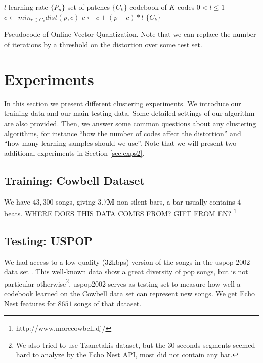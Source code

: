 \documentclass{article}
\begin{document}
\begin{algorithm}
\begin{algorithmic}
\STATE$l$ learning rate
\STATE$\{P_n\}$ set of patches
\STATE$\{C_k\}$ codebook of $K$ codes
\REQUIRE $0 < l \leq 1$
\STATE$c \leftarrow min_{c \in C_k} dist(p,c)$
\STATE$c \leftarrow c + (p - c) * l$
\ENDFOR
\ENDFOR
\RETURN $\{C_k\}$
\caption{\small{Pseudocode of Online Vector Quantization. Note that we can 
replace the number of iterations by a threshold on the distortion over some 
test set.}
\label{algo:vq}}
\end{algorithmic}
\end{algorithm}



\section{Experiments}\label{sec:experiments}
In this section we present different clustering experiments. We introduce
our training data and our main testing data. Some detailed settings
of our algorithm are also provided. Then, we answer some common questions
about any clustering algorithms, for instance 
``how the number of codes affect the distortion''
and ``how many learning samples should we use''.
Note that we will present two additional experiments in 
Section \ref{sec:exps2}.


\subsection{Training: Cowbell Dataset}\label{sec:traindata}
We have $43,300$ songs, giving  
$\mathbf{3.7}$\textbf{M} 
non silent bars, a bar usually 
contains $4$ beats. WHERE DOES THIS DATA COMES FROM? GIFT FROM EN?
\footnote{http://www.morecowbell.dj/}

\subsection{Testing: USPOP}\label{sec:testdata}
We had access to a low quality (32kbps) version of the songs in the uspop 2002 
data set \cite{uspop2002}.
This well-known data show a great diversity of pop songs, but is not particular
otherwise\footnote{We 
also tried to use Tzanetakis dataset, 
but the $30$ seconds segments seemed hard to analyze by the Echo Nest API, 
most did not contain any bar.}.
uspop2002 serves as testing set to measure how well a codebook learned on
the Cowbell data set can represent new songs. We get Echo Nest features
for $8651$ songs of that dataset.
\end{document}
